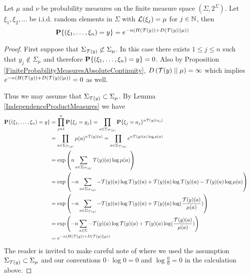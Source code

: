 \begin{lem}\label{ProbabilityOfAType}Let $\mu$ and $\nu$ be probability measures on the finite
  measure space $(\Sigma, 2^{\Sigma})$.  Let $\xi_1, \xi_2, \dotsc$ be i.i.d. random
  elements in $\Sigma$ with $\mathcal{L}(\xi_j) = \mu$ for $j \in \mathbb{N}$, then
\begin{align*}
\textbf{P}\{(\xi_1, \dotsc, \xi_n) = y\} &= e^{-n(H(\mathcal{T}(y)) + D\left( \mathcal{T}(y) \mid\mid \mu \right))}
\end{align*}
\end{lem}
\begin{proof}
First suppose that $\Sigma_{\mathcal{T}(y)} \not\subset \Sigma_\mu$.  In this case there exists $1 \leq j \leq n$ such that $y_j \notin \Sigma_\mu$ and therefore
$\textbf{P}\{(\xi_1, \dotsc, \xi_n) = y\} =0$.  Also by Proposition \ref{FiniteProbabilityMeasuresAbsoluteContinuity}, $D\left( \mathcal{T}(y) \mid\mid \mu \right) = \infty$ which implies $ e^{-n(H(\mathcal{T}(y)) + D\left( \mathcal{T}(y) \mid\mid \mu \right))}=0$ as well.

Thus we may assume that $\Sigma_{\mathcal{T}(y)} \subset \Sigma_\mu$.  By Lemma \ref{IndependenceProductMeasures} we
have
\begin{align*}
\textbf{P}\{(\xi_1, \dotsc, \xi_n) = y\} &= \prod_{j=1}^n \textbf{P}\{\xi_j= y_j\} = \prod_{a \in \Sigma_{\mathcal{T}(y)}} \textbf{P}\{\xi_j= a_j\}^{n \mathcal{T}(y)(a_j)} \\
&= \prod_{a \in \Sigma_{\mathcal{T}(y)}} \mu(a)^{n \mathcal{T}(y)(a)} = \prod_{a \in \Sigma_{\mathcal{T}(y)}} e^{n \mathcal{T}(y)(a) \log \mu(a)} \\
&= \exp \left(n \sum_{a \in \Sigma_{\mathcal{T}(y)}} \mathcal{T}(y)(a) \log \mu(a) \right) \\
&= \exp \left( -n \sum_{a \in \Sigma_{\mathcal{T}(y)}} - \mathcal{T}(y)(a) \log \mathcal{T}(y)(a) + \mathcal{T}(y)(a) \log \mathcal{T}(y)(a) - \mathcal{T}(y)(a) \log \mu(a) \right ) \\
&= \exp \left( -n \sum_{a \in \Sigma_{\mathcal{T}(y)}} - \mathcal{T}(y)(a) \log \mathcal{T}(y)(a) + \mathcal{T}(y)(a) \log( \frac{ \mathcal{T}(y)(a) }{\mu(a)} )\right) \\
&= \exp \left( -n \sum_{a \in \Sigma} - \mathcal{T}(y)(a) \log \mathcal{T}(y)(a) + \mathcal{T}(y)(a) \log( \frac{ \mathcal{T}(y)(a) }{\mu(a)} )\right) \\
&= e^{-n(H(\mathcal{T}(y)) + D\left( \mathcal{T}(y) \mid\mid \mu \right))}
\end{align*}
The reader is invited to make careful note of where we used the assumption $\Sigma_{\mathcal{T}(y)} \subset \Sigma_\mu$ and our conventions $0 \cdot \log 0 = 0$ and $\log \frac{0}{0} = 0$ in the calculation above.
\end{proof}

